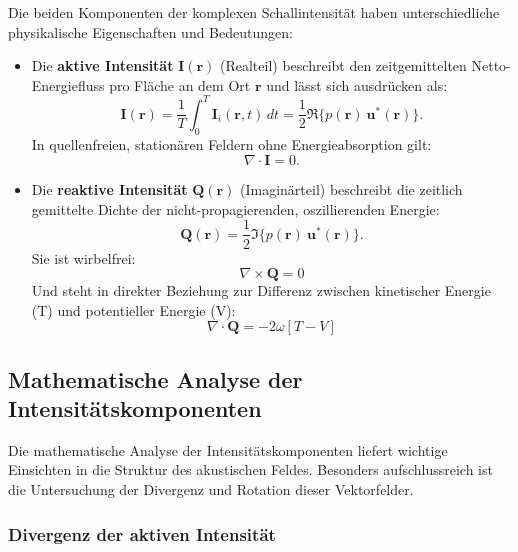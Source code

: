 Die beiden Komponenten der komplexen Schallintensität haben unterschiedliche physikalische Eigenschaften und Bedeutungen:

\begin{itemize}
\item Die \textbf{aktive Intensität} $\boldsymbol{I}(\boldsymbol{r})$ (Realteil) beschreibt den zeitgemittelten Netto-Energiefluss pro Fläche an dem Ort $\boldsymbol{r}$ und lässt sich ausdrücken als:
\begin{equation}
\boldsymbol{I}(\boldsymbol{r})
=
\frac{1}{T}\int_0^T \boldsymbol{I}_i(\boldsymbol{r},t)\,dt
=
\frac{1}{2}\Re\{p(\boldsymbol{r})~\boldsymbol{u}^*(\boldsymbol{r})\}.
\end{equation}
In quellenfreien, stationären Feldern ohne Energieabsorption gilt:
\begin{equation}
\nabla \cdot \boldsymbol{I} = 0.
\end{equation}

\item Die \textbf{reaktive Intensität} $\boldsymbol{Q}(\boldsymbol{r})$ (Imaginärteil) beschreibt die zeitlich gemittelte Dichte der nicht-propagierenden, oszillierenden Energie: 
\begin{equation}
\boldsymbol{Q}(\boldsymbol{r}) = \frac{1}{2}\Im\{p(\boldsymbol{r})~\boldsymbol{u}^*(\boldsymbol{r})\}.
\label{helmholtz:equationReaktiveIntensitaet}
\end{equation}
Sie ist wirbelfrei:
\begin{equation}
\nabla \times \boldsymbol{Q} = 0
\end{equation}
Und steht in direkter Beziehung zur Differenz zwischen kinetischer Energie (T) und potentieller Energie (V):
\begin{equation}
\nabla \cdot \boldsymbol{Q} = -2 \omega [T-V]
\end{equation}
\end{itemize}


\subsection{Mathematische Analyse der Intensitätskomponenten
\label{helmholtz:subsection:def_Schallintensitaet}}

Die mathematische Analyse der Intensitätskomponenten liefert wichtige Einsichten in die Struktur des akustischen Feldes. Besonders aufschlussreich ist die Untersuchung der Divergenz und Rotation dieser Vektorfelder.

\subsubsection{Divergenz der aktiven Intensität}

